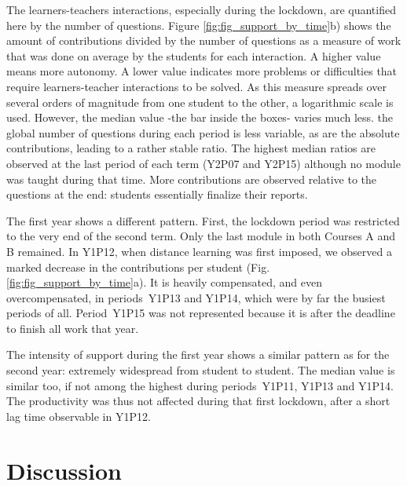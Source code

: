 \documentclass{aims}
\theoremstyle{definition}
\begin{document}
The learners-teachers interactions, especially during the lockdown, are
quantified here by the number of questions. Figure
\ref {fig:fig_support_by_time}b) shows the amount of contributions
divided by the number of questions as a measure of work that was done on
average by the students for each interaction. A higher value means more
autonomy. A lower value indicates more problems or difficulties that
require learners-teacher interactions to be solved. As this measure
spreads over several orders of magnitude from one student to the other,
a logarithmic scale is used. However, the median value -the bar inside
the boxes- varies much less. the global number of questions during each
period is less variable, as are the absolute contributions, leading to a
rather stable ratio. The highest median ratios are observed at the last
period of each term (Y2P07 and Y2P15) although no module was taught
during that time. More contributions are observed relative to the
questions at the end: students essentially finalize their reports.

The first year shows a different pattern. First, the lockdown period was
restricted to the very end of the second term. Only the last module in
both Courses A and B remained. In Y1P12, when distance learning was
first imposed, we observed a marked decrease in the contributions per
student (Fig. \ref {fig:fig_support_by_time}a). It is heavily
compensated, and even overcompensated, in periods~Y1P13 and Y1P14, which
were by far the busiest periods of all. Period~Y1P15 was not represented
because it is after the deadline to finish all work that year.

The intensity of support during the first year shows a similar pattern
as for the second year: extremely widespread from student to student.
The median value is similar too, if not among the highest during
periods~Y1P11, Y1P13 and Y1P14. The productivity was thus not affected
during that first lockdown, after a short lag time observable in Y1P12.

\hypertarget{discussion}{%
\section{Discussion}\label{discussion}}
\end{document}
